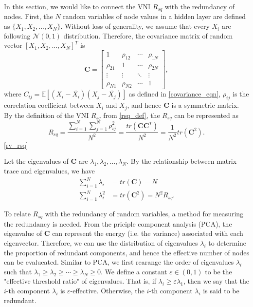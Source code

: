In this section, we would like to connect the VNI $R_{sq}$ with the redundancy of nodes.
First, the $N$ random variables of node values in a hidden layer are defined as $\{X_1, X_2, ..., X_N\}$.
Without loss of generality, we assume that every $X_i$ are following $\mathcal{N}(0, 1)$ distribution.
Therefore, the covariance matrix of random vector $[X_1, X_2, ..., X_N]^T$ is
\begin{equation}
    \mathbf{C}=
    \begin{bmatrix}
        1 & \rho_{12} & \cdots & \rho_{1N} \\
        \rho_{21} & 1 & \cdots & \rho_{2N} \\
        \vdots & \vdots & \ddots & \vdots  \\
        \rho_{N1} & \rho_{N2} & \cdots & 1
    \end{bmatrix},
    \label{rv_cov}
\end{equation}
where $C_{ij}=\mathbb{E}[(X_i-\overline{X_i})(X_j-\overline{X_j})]$ as defined in
\eqref{covariance_eqn}, $\rho_{ij}$ is the correlation coefficient between $X_i$ and $X_j$,
and hence $\mathbf{C}$ is a symmetric matrix.
By the definition of the VNI $R_{sq}$ from \eqref{rsq_def}, the $R_{sq}$
can be represented as
\begin{equation}
    R_{sq}=\frac{\sum_{i=1}^N\sum_{j=1}^N\rho_{ij}^2}{N^2}
    =\frac{tr(\mathbf{C}\mathbf{C}^T)}{N^2}=\frac{1}{N^2}tr(\mathbf{C}^2).
    \label{rv_rsq}
\end{equation}
\eqref{rv_rsq}

Let the eigenvalues of $\mathbf{C}$ are $\lambda_1, \lambda_2, \dots, \lambda_N$.
By the relationship between matrix trace and eigenvalues, we have
\begin{equation}
    \begin{aligned}
        \sum_{i=1}^N\lambda_i&=tr(\mathbf{C})=N\\
    \sum_{i=1}^N\lambda_i^2&=tr(\mathbf{C}^2)=N^2R_{sq}.
    \end{aligned}
    \label{rv_eigen}
\end{equation}

To relate $R_{sq}$ with the redundancy of random variables, a method for measuring the redundancy
is needed.
From the priciple component analysis (PCA), the eigenvalue of $\mathbf{C}$ can represent the 
energy (i.e. the variance) associated with each eigenvector.
Therefore, we can use the distribution of eigenvalues $\lambda_i$ to determine the proportion of
redundant components, and hence the effective number of nodes can be evalueated.
Similar to PCA, we first rearange the order of eigenvalues $\lambda_i$ such that
$\lambda_1\geq\lambda_2\geq\cdots\geq\lambda_N\geq 0$.
We define a constant $\varepsilon\in(0, 1)$ to be the "effective threshold ratio" of eigenvalues.
That is, if $\lambda_i \geq \varepsilon\lambda_1$, then we say that the $i$-th component $\lambda_i$ is
$\varepsilon$-effective.
Otherwise, the $i$-th component $\lambda_i$ is said to be redundant.

